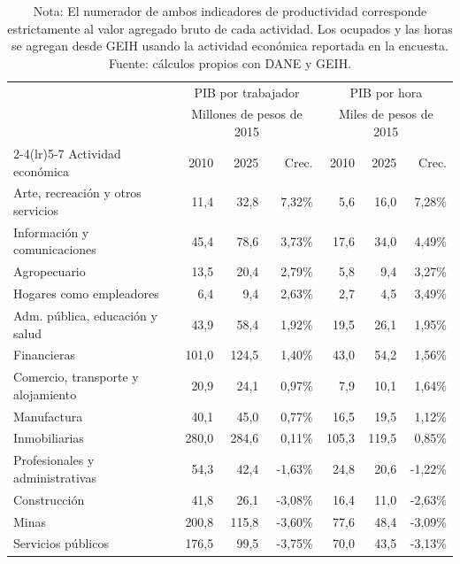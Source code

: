 \begin{table}[H]
\centering
\caption{Productividad laboral por actividad económica CIIU, 2010--2025}
\label{tab:pib_geih_productividad_sector}
\footnotesize
\begin{tabular}{lrrrrrr}
\toprule
& \multicolumn{3}{c}{PIB por trabajador} & \multicolumn{3}{c}{PIB por hora} \\
& \multicolumn{3}{c}{\footnotesize Millones de pesos de 2015} & \multicolumn{3}{c}{\footnotesize Miles de pesos de 2015} \\
\cmidrule(lr){2-4}\cmidrule(lr){5-7}
Actividad económica & 2010 & 2025 & Crec. & 2010 & 2025 & Crec. \\
\midrule
Arte, recreación y otros servicios & 11,4 & 32,8 & 7,32\% & 5,6 & 16,0 & 7,28\% \\
Información y comunicaciones & 45,4 & 78,6 & 3,73\% & 17,6 & 34,0 & 4,49\% \\
Agropecuario & 13,5 & 20,4 & 2,79\% & 5,8 & 9,4 & 3,27\% \\
Hogares como empleadores & 6,4 & 9,4 & 2,63\% & 2,7 & 4,5 & 3,49\% \\
Adm. pública, educación y salud & 43,9 & 58,4 & 1,92\% & 19,5 & 26,1 & 1,95\% \\
Financieras & 101,0 & 124,5 & 1,40\% & 43,0 & 54,2 & 1,56\% \\
Comercio, transporte y alojamiento & 20,9 & 24,1 & 0,97\% & 7,9 & 10,1 & 1,64\% \\
Manufactura & 40,1 & 45,0 & 0,77\% & 16,5 & 19,5 & 1,12\% \\
Inmobiliarias & 280,0 & 284,6 & 0,11\% & 105,3 & 119,5 & 0,85\% \\
Profesionales y administrativas & 54,3 & 42,4 & -1,63\% & 24,8 & 20,6 & -1,22\% \\
Construcción & 41,8 & 26,1 & -3,08\% & 16,4 & 11,0 & -2,63\% \\
Minas & 200,8 & 115,8 & -3,60\% & 77,6 & 48,4 & -3,09\% \\
Servicios públicos & 176,5 & 99,5 & -3,75\% & 70,0 & 43,5 & -3,13\% \\
\bottomrule
\end{tabular}
\caption*{\footnotesize Nota: El numerador de ambos indicadores de productividad corresponde estrictamente al valor agregado bruto de cada actividad. %
Los ocupados y las horas se agregan desde GEIH usando la actividad económica reportada en la encuesta. Fuente: cálculos propios con DANE y GEIH.}
\end{table}